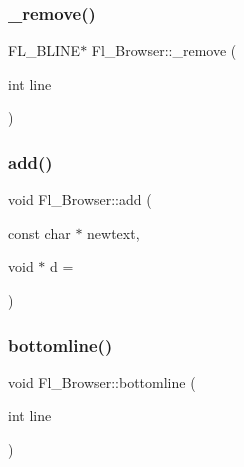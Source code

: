\subsubsection{\texorpdfstring{\+\_\+remove()}{\_remove()}}
{\footnotesize\ttfamily F\+L\+\_\+\+B\+L\+I\+NE$\ast$ Fl\+\_\+\+Browser\+::\+\_\+remove (\begin{DoxyParamCaption}\item[{int}]{line }\end{DoxyParamCaption})\hspace{0.3cm}{\ttfamily [protected]}}

\mbox{\label{class_fl___browser_af2761597d5618fa4d1339563ee127e29}} 
\subsubsection{\texorpdfstring{add()}{add()}}
{\footnotesize\ttfamily void Fl\+\_\+\+Browser\+::add (\begin{DoxyParamCaption}\item[{const char $\ast$}]{newtext,  }\item[{void $\ast$}]{d = {} }\end{DoxyParamCaption})}

\mbox{\label{class_fl___browser_ad74d4d85549d4563a584ab0759832f6d}} 
\subsubsection{\texorpdfstring{bottomline()}{bottomline()}}
{\footnotesize\ttfamily void Fl\+\_\+\+Browser\+::bottomline (\begin{DoxyParamCaption}\item[{int}]{line }\end{DoxyParamCaption})\hspace{0.3cm}{\ttfamily [inline]}}

